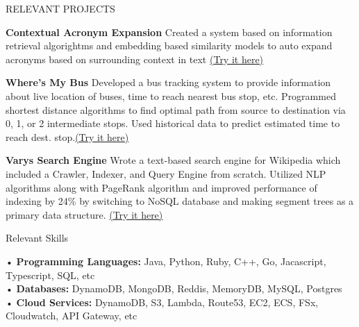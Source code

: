 \documentclass{resume} %
\begin{document}
\vspace{-1.5em}
\begin{rSection}{RELEVANT PROJECTS}
\vspace{-1.25em}
\item \textbf{Contextual Acronym Expansion} {Created a system based on information retrieval algorightms and embedding based similarity models to auto expand acronyms based on surrounding context in text \href{https://github.com/adityathakker/AcronymExpansion}{(Try it here)}}
\item \textbf{Where's My Bus} {Developed a bus tracking system to provide information about live location of buses, time to reach
nearest bus stop, etc. Programmed shortest distance algorithms to find optimal path from source to destination via 0, 1, or 2 intermediate
stops. Used historical data to predict estimated time to reach dest. stop.\href{https://github.com/adityathakker/Wheres-My-Bus}{(Try it here)}}
\item \textbf{Varys Search Engine} {Wrote a text-based search engine for Wikipedia which included a Crawler, Indexer, and Query Engine from scratch.  Utilized NLP algorithms along with PageRank algorithm and improved performance of indexing by 24\% by switching to NoSQL database and making segment trees as a primary data structure. \href{https://github.com/adityathakker/Varys-Search-Engine}{(Try it here)}}\\
\end{rSection} 

\vspace{-1.5em}
\begin{rSection}{Relevant Skills} 
\begin{addmargin}[0.5em]{0em}
• \textbf{Programming Languages:} Java, Python, Ruby, C++, Go, Jacascript, Typescript, SQL, etc\\
• \textbf{Databases:} DynamoDB, MongoDB, Reddis, MemoryDB, MySQL, Postgres\\
• \textbf{Cloud Services:} DynamoDB, S3, Lambda, Route53, EC2, ECS, FSx, Cloudwatch, API Gateway, etc\\
\end{addmargin} 


\end{rSection}



\end{document}
